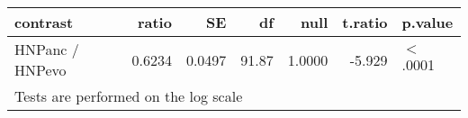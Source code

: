 \begin{table}[ht]
\centering
\begin{tabular}{lrrrrrl}
  \hline
contrast & ratio & SE & df & null & t.ratio & p.value \\ 
  \hline
HNPanc / HNPevo & 0.6234 & 0.0497 & 91.87 & 1.0000 & -5.929 & $<$.0001 \\ 
   \hline
\multicolumn{7}{l}{{\footnotesize Tests are performed on the log scale}}\\
\end{tabular}
\end{table}

